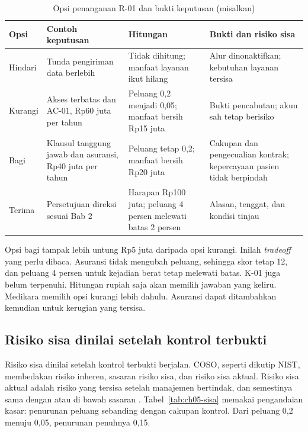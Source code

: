 \begin{table}[!htb]
  \centering\small
  \caption{Opsi penanganan R-01 dan bukti keputusan (misalkan)}\label{tab:ch05-penanganan}
  \begin{tabularx}{\textwidth}{|>{\raggedright\arraybackslash}p{}|>{\raggedright\arraybackslash}X|>{\raggedright\arraybackslash}X|>{\raggedright\arraybackslash}X|}
    \hline
    \textbf{Opsi} & \textbf{Contoh keputusan} & \textbf{Hitungan} & \textbf{Bukti dan risiko sisa} \\
    \hline
    Hindari & Tunda pengiriman data berlebih & Tidak dihitung; manfaat layanan ikut hilang & Alur
    dinonaktifkan; kebutuhan layanan tersisa \\ \hline
    Kurangi & Akses terbatas dan AC-01, Rp60 juta per tahun & Peluang 0,2 menjadi 0,05; manfaat bersih
    Rp15 juta & Bukti pencabutan; akun sah tetap berisiko \\ \hline
    Bagi & Klausul tanggung jawab dan asuransi, Rp40 juta per tahun & Peluang tetap 0,2; manfaat bersih
    Rp20 juta & Cakupan dan pengecualian kontrak; kepercayaan pasien tidak berpindah \\ \hline
    Terima & Persetujuan direksi sesuai Bab 2 & Harapan Rp100 juta; peluang 4 persen melewati batas 2
    persen & Alasan, tenggat, dan kondisi tinjau \\ \hline
  \end{tabularx}
\end{table}

Opsi bagi tampak lebih untung Rp5 juta daripada opsi kurangi. Inilah \textit{tradeoff} yang perlu
dibaca. Asuransi tidak mengubah peluang, sehingga skor tetap 12, dan peluang 4 persen untuk kejadian
berat tetap melewati batas. K-01 juga belum terpenuhi. Hitungan rupiah saja akan memilih jawaban yang
keliru. Medikara memilih opsi kurangi lebih dahulu. Asuransi dapat ditambahkan kemudian untuk kerugian
yang tersisa.

\subsection*{Risiko sisa dinilai setelah kontrol terbukti}

Risiko sisa dinilai setelah kontrol terbukti berjalan. COSO, seperti dikutip NIST, membedakan risiko
inheren, sasaran risiko sisa, dan risiko sisa aktual. Risiko sisa aktual adalah risiko yang tersisa
setelah manajemen bertindak, dan semestinya sama dengan atau di bawah sasaran
\cite{cosoerm2017,c05-nist-ir8286r1}. Tabel~\ref{tab:ch05-sisa} memakai pengandaian kasar: penurunan
peluang sebanding dengan cakupan kontrol. Dari peluang 0,2 menuju 0,05, penurunan penuhnya 0,15.

